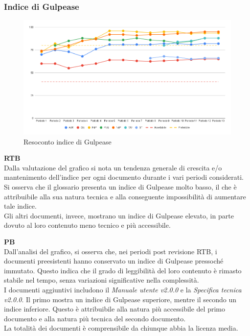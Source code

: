 \subsubsection{Indice di Gulpease}

\vspace{0.3cm}

\begin{figure}[H]
    \centering
    \includegraphics[width=1\textwidth]{../Images/PianoDiQualifica/Gulpease.png}
    \caption{Resoconto indice di Gulpease}
    \label{fig:Indice di Gulpease}
\end{figure}

\vspace{0.2cm}

\textbf{RTB} \\
Dalla valutazione del grafico si nota un tendenza generale di crescita e/o mantenimento dell'indice per ogni documento durante i vari periodi considerati. \\
Si osserva che il glossario presenta un indice di Gulpease molto basso, il che è attribuibile alla sua natura tecnica e alla conseguente impossibilità di aumentare tale indice. \\
Gli altri documenti, invece, mostrano un indice di Gulpease elevato, in parte dovuto al loro contenuto meno tecnico e più accessibile.

\vspace{0.3cm}

\textbf{PB} \\
Dall’analisi del grafico, si osserva che, nei periodi post revisione RTB, i documenti preesistenti hanno conservato un indice di Gulpease pressoché immutato. Questo indica che il grado di leggibilità del loro contenuto è rimasto stabile nel tempo, senza variazioni significative nella complessità. \\
I documenti aggiuntivi includono il \textit{Manuale utente v2.0.0} e la \textit{Specifica tecnica v2.0.0}. Il primo mostra un indice di Gulpease superiore, mentre il secondo un indice inferiore. Questo è attribuibile alla natura più accessibile del primo documento e alla natura più tecnica del secondo documento. \\
La totalità dei documenti è comprensibile da chiunque abbia la licenza media.